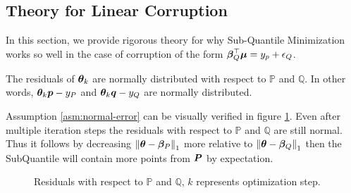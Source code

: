\documentclass{article} %
\newcommand{\norm}[1]{\left\lVert#1\right\rVert}
\begin{document}
\begin{appendices}
	\section{Theory for Linear Corruption}
	In this section, we provide rigorous theory for why Sub-Quantile Minimization works so well in the case of corruption of the form $\displaystyle {\bm{\beta}}_Q^\top {\bm{\mu}} = y_p + {\epsilon}_Q$.
	\begin{assumption}\label{asm:normal-error}
		The residuals of ${\bm{\theta}}_k$ are normally distributed with respect to $\mathbb{P}$ and $\mathbb{Q}$. In other words, ${\bm{\theta}}_k {\bm{p}} - y_P$ and ${\bm{\theta}}_k {\bm{q}} - y_Q$ are normally distributed.
	\end{assumption}
	Assumption \ref{asm:normal-error} can be visually verified in figure \ref{fig:normal-residual}. Even after multiple iteration steps the residuals with respect to $\mathbb{P}$ and $\mathbb{Q}$ are still normal. Thus it follows by decreasing $\norm{\vtheta - \vbeta_P}_1$ more relative to $\norm{\vtheta - \vbeta_Q}_1$ then the SubQuantile will contain more points from ${\bm{P}}$ by expectation. 
	\begin{figure}
		\begin{minipage}[htbp]{0.24\textwidth}
			\centering
			
			\label{fig:1}
		\end{minipage}
		\hfill
		\begin{minipage}[htbp]{0.24\textwidth}
			\centering
			
			\label{fig:2}
		\end{minipage}
		\hfill
		\begin{minipage}[htbp]{0.24\textwidth}
			\centering
			
			\label{fig:3}
		\end{minipage}
		\hfill
		\begin{minipage}[htbp]{0.24\textwidth}
			\centering
			
			\label{fig:4}
		\end{minipage}
		\caption{Residuals with respect to $\mathbb{P}$ and $\mathbb{Q}$, $k$ represents optimization step.}
		\label{fig:normal-residual}
	\end{figure}
	

\end{appendices}
\end{document}
